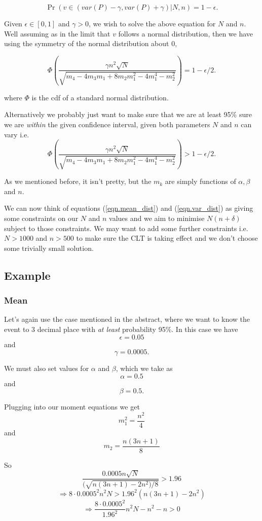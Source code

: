 \documentclass[
10pt, %
a4paper, %
oneside, %
headinclude,footinclude, %
BCOR5mm, %
]{scrartcl}
\begin{document}
$$ \Pr (v \in (var(P) - \gamma, var(P) + \gamma)|N, n ) = 1 - \epsilon. $$

Given $\epsilon \in [0,1]$ and $\gamma > 0$, we wish to solve the above equation for $N$ and $n$. Well assuming as in the limit that $v$ follows a normal distribution, then we have using the symmetry of the normal distribution about $0$,

$$ \Phi \left (\frac{\gamma n^2 \sqrt{N}}{\sqrt{m_4 - 4m_3m_1 + 8m_2m_1^2 - 4m_1^4 - m_2^2}}\right ) = 1 - \epsilon/2. $$

where $\Phi$ is the cdf of a standard normal distribution. 

 
Alternatively we probably just want to make sure that we are at least 95\% sure we are \textit{within} the given confidence interval, given both parameters $N$ and $n$ can vary i.e.
\begin{equation} \label{eqn.var_dist}
 \Phi \left (\frac{\gamma n^2 \sqrt{N}}{\sqrt{m_4 - 4m_3m_1 + 8m_2m_1^2 - 4m_1^4 - m_2^2}}\right ) > 1 - \epsilon/2.
 \end{equation}

As we mentioned before, it isn't pretty, but the $m_k$ are simply functions of $\alpha, \beta$ and $n$.

We can now think of equations (\ref{eqn.mean_dist}) and (\ref{eqn.var_dist}) as giving some constraints on our $N$ and $n$ values and we aim to minimise $N (n + \delta)$ subject to those constraints. We may want to add some further constraints i.e. $N > 1000$ and $n > 500$ to make sure the CLT is taking effect and we don't choose some trivially small solution.

\subsection{Example}
\subsubsection{Mean}
Let's again use the case mentioned in the abstract, where we want to know the event to 3 decimal place with \textit{at least} probability 95\%. In this case we have
$$ \epsilon = 0.05 $$
and
$$ \gamma = 0.0005. $$

We must also set values for $\alpha$ and $\beta$, which we take as
$$ \alpha = 0.5 $$
and
$$ \beta = 0.5. $$

Plugging into our moment equations we get
$$ m_1^2 = \frac{n^2}{4} $$
and
$$ m_2 = \frac{n(3n+1)}{8} $$

So
$$ \frac{0.0005 n \sqrt{N}}{(\sqrt{n(3n+1) - 2n^2)/8}} > 1.96 $$
$$ \Rightarrow 8 \cdot 0.0005^2 n^2 N > 1.96^2(n(3n+1) -2n^2 )$$
\begin{equation} \label{eqn.example}
  \Rightarrow \frac{8 \cdot 0.0005^2}{1.96^2} n^2 N - n^2 - n > 0
\end{equation}
\end{document}
